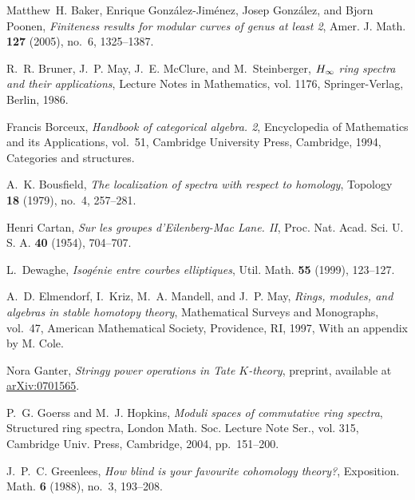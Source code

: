 \documentclass{gtpart}
\theoremstyle{definition}
\theoremstyle{remark}
\numberwithin{equation}{section}
\numberwithin{thm}{section}
\begin{document}
\begin{thebibliography}
Matthew~H. Baker, Enrique Gonz{\'a}lez-Jim{\'e}nez, Josep Gonz{\'a}lez, and
  Bjorn Poonen, \emph{Finiteness results for modular curves of genus at least
  2}, Amer. J. Math. \textbf{127} (2005), no.~6, 1325--1387. 

R.~R. Bruner, J.~P. May, J.~E. McClure, and M.~Steinberger, \emph{{$H\sb \infty
  $} ring spectra and their applications}, Lecture Notes in Mathematics, vol.
  1176, Springer-Verlag, Berlin, 1986. 

Francis Borceux, \emph{Handbook of categorical algebra. 2}, Encyclopedia of
  Mathematics and its Applications, vol.~51, Cambridge University Press,
  Cambridge, 1994, Categories and structures. 

A.~K. Bousfield, \emph{The localization of spectra with respect to homology},
  Topology \textbf{18} (1979), no.~4, 257--281. 

Henri Cartan, \emph{Sur les groupes d'{E}ilenberg-{M}ac {L}ane. {II}}, Proc.
  Nat. Acad. Sci. U. S. A. \textbf{40} (1954), 704--707. 

L.~Dewaghe, \emph{Isog\'enie entre courbes elliptiques}, Util. Math.
  \textbf{55} (1999), 123--127. 

A.~D. Elmendorf, I.~Kriz, M.~A. Mandell, and J.~P. May, \emph{Rings, modules,
  and algebras in stable homotopy theory}, Mathematical Surveys and Monographs,
  vol.~47, American Mathematical Society, Providence, RI, 1997, With an
  appendix by M. Cole. 

Nora Ganter, \emph{Stringy power operations in {T}ate ${K}$-theory}, preprint,
  available at \href{http://arxiv.org/abs/math/0701565}{arXiv:0701565}.

P.~G. Goerss and M.~J. Hopkins, \emph{Moduli spaces of commutative ring
  spectra}, Structured ring spectra, London Math. Soc. Lecture Note Ser., vol.
  315, Cambridge Univ. Press, Cambridge, 2004, pp.~151--200. 

J.~P.~C. Greenlees, \emph{How blind is your favourite cohomology theory?},
  Exposition. Math. \textbf{6} (1988), no.~3, 193--208. 


\end{thebibliography}
\end{document}

